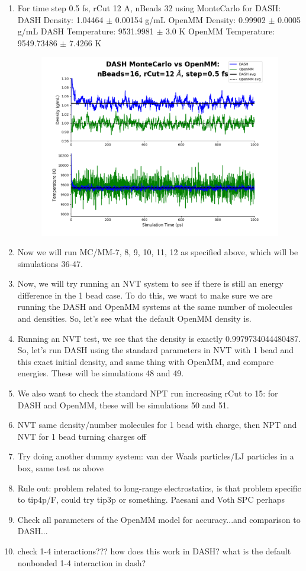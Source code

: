 \documentclass[12pt,reqno]{amsart}
\numberwithin{equation}{section}
\begin{document}
\begin{enumerate}
\item For time step 0.5 fs, rCut 12 A, nBeads 32 using MonteCarlo for DASH:
\subitem DASH Density: 1.04464 $\pm$ 0.00154 g/mL
\subitem OpenMM Density: 0.99902 $\pm$ 0.0005 g/mL
\subitem DASH Temperature: 9531.9981 $\pm$ 3.0  K
\subitem OpenMM Temperature:  9549.73486 $\pm$ 7.4266 K
\begin{figure}[H]
\centering
\includegraphics[scale=0.7]{MC-MM-nBead32-rCut12-ts05}
\end{figure}

\item Now we will run MC/MM-7, 8, 9, 10, 11, 12 as specified above, which will be simulations 36-47. 
\item Now, we will try running an NVT system to see if there is still an energy difference in the 1 bead case.  To do this, we want to make sure we are running the DASH and OpenMM systems at the same number of molecules and densities.  So, let's see what the default OpenMM density is.
\item Running an NVT test, we see that the density is exactly 0.9979734044480487.  So, let's run DASH using the standard parameters in NVT with 1 bead and this exact initial density, and same thing with OpenMM, and compare energies.  These will be simulations 48 and 49.   
\item We also want to check the standard NPT run increasing rCut to 15: for DASH and OpenMM, these will be simulations 50 and 51.  


\item NVT same density/number molecules for 1 bead with charge, then NPT and NVT for 1 bead turning charges off
\item Try doing another dummy system: van der Waals particles/LJ particles in a box, same test as above 
\item Rule out: problem related to long-range electrostatics, is that problem specific to tip4p/F, could try tip3p or something.  Paesani and Voth SPC perhaps
\item Check all parameters of the OpenMM model for accuracy...and comparison to DASH...
\item check 1-4 interactions??? how does this work in DASH?  what is the default nonbonded 1-4 interaction in dash?
\end{enumerate}
\end{document}
